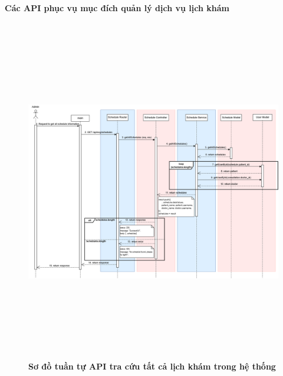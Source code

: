 \paragraph{Các API phục vụ mục đích quản lý dịch vụ lịch khám}
\mbox{}
\begin{figure}[H]
	\centering
	\includegraphics[width=15cm,height=15cm]{Images/api_sequence/schedule/getAllSchedules.drawio.png}
	\caption[Sơ đồ tuần tự API tra cứu tất cả lịch khám trong hệ thống]{\bfseries \fontsize{12pt}{0pt}\selectfont Sơ đồ tuần tự API tra cứu tất cả lịch khám trong hệ thống}
	\label{sequence_diagram_get_schedule}
\end{figure}

